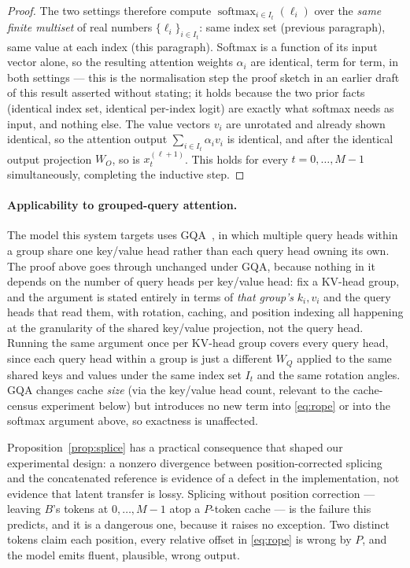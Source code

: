 \documentclass[11pt]{article}
\begin{document}
\begin{proof}
The two settings therefore compute
$\operatorname{softmax}_{i \in I_t}(\ell_i)$ over the \emph{same finite
multiset} of real numbers $\{\ell_i\}_{i \in I_t}$: same index set (previous
paragraph), same value at each index (this paragraph). Softmax is a function
of its input vector alone, so the resulting attention weights $\alpha_i$ are
identical, term for term, in both settings --- this is the normalisation step
the proof sketch in an earlier draft of this result asserted without stating;
it holds because the two prior facts (identical index set, identical per-index
logit) are exactly what softmax needs as input, and nothing else. The value
vectors $v_i$ are unrotated and already shown identical, so the attention
output $\sum_{i \in I_t} \alpha_i v_i$ is identical, and after the identical
output projection $W_O$, so is $x_t^{(\ell+1)}$. This holds for every
$t = 0,\dots,M-1$ simultaneously, completing the inductive step.
\end{proof}

\paragraph{Applicability to grouped-query attention.} The model this system
targets uses GQA~\cite{ainslie2023gqa}, in which multiple query heads within a
group share one key/value head rather than each query head owning its own.
The proof above goes through unchanged under GQA, because nothing in it
depends on the number of query heads per key/value head: fix a KV-head group,
and the argument is stated entirely in terms of \emph{that group's} $k_i, v_i$
and the query heads that read them, with rotation, caching, and position
indexing all happening at the granularity of the shared key/value projection,
not the query head. Running the same argument once per KV-head group covers
every query head, since each query head within a group is just a different
$W_Q$ applied to the same shared keys and values under the same index set
$I_t$ and the same rotation angles. GQA changes cache \emph{size} (via the
key/value head count, relevant to the cache-census experiment below) but
introduces no new term into \eqref{eq:rope} or into the softmax argument
above, so exactness is unaffected.

Proposition~\ref{prop:splice} has a practical consequence that shaped our
experimental design: a nonzero divergence between position-corrected splicing
and the concatenated reference is evidence of a defect in the implementation,
not evidence that latent transfer is lossy. Splicing without position
correction --- leaving $B$'s tokens at $0,\dots,M-1$ atop a $P$-token cache ---
is the failure this predicts, and it is a dangerous one, because it raises no
exception. Two distinct tokens claim each position, every relative offset in
\eqref{eq:rope} is wrong by $P$, and the model emits fluent, plausible, wrong
output.
\end{document}
